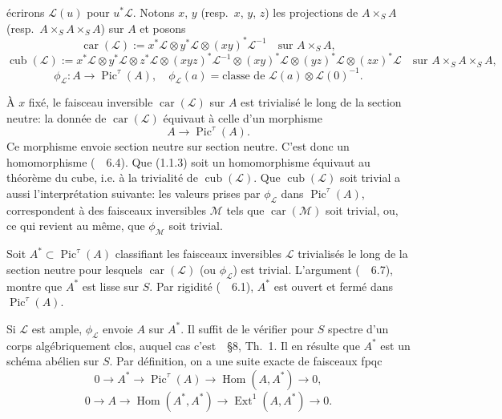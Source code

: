 \documentclass[11pt,a4paper]{article}
\theoremstyle{plain}
\theoremstyle{definition}
\DeclareMathOperator{\Ext}{Ext}
\DeclareMathOperator{\Hom}{Hom}
\DeclareMathOperator{\car}{car}
\DeclareMathOperator{\cub}{cub}
\DeclareMathOperator{\Pic}{Pic}
\begin{document}
\'ecrirons $\mathscr{L}(u)$ pour $u^*\mathscr{L}$. Notons $x$, $y$ (resp.~$x$, $y$, $z$) les projections de $A \times_S A$
(resp.~$A \times_S A \times_S A$) sur $A$ et posons
\begin{equation}
\car(\mathscr{L}) := x^*\mathscr{L} \otimes y^*\mathscr{L} \otimes (xy)^*\mathscr{L}^{-1} \quad \text{sur } A \times_S A,
\end{equation}
\begin{equation}
\cub(\mathscr{L}) := x^*\mathscr{L} \otimes y^*\mathscr{L} \otimes z^*\mathscr{L} \otimes (xyz)^*\mathscr{L}^{-1}
\otimes (xy)^*\mathscr{L} \otimes (yz)^*\mathscr{L} \otimes (zx)^*\mathscr{L} \quad \text{sur } A \times_S A \times_S A,
\end{equation}
\begin{equation}
\phi_{\mathscr{L}} : A \longrightarrow \Pic^\tau(A), \quad \phi_{\mathscr{L}}(a) = \text{classe de } \mathscr{L}(a) \otimes \mathscr{L}(0)^{-1}.
\end{equation}

\`A $x$ fix\'e, le faisceau inversible $\car(\mathscr{L})$ sur $A$ est trivialis\'e le long de la section
neutre: la donn\'ee de $\car(\mathscr{L})$ \'equivaut \`a celle d'un morphisme
\begin{equation}
A \longrightarrow \Pic^\tau(A).
\end{equation}
Ce morphisme envoie section neutre sur section neutre. C'est donc un
homomorphisme (~\cite{GIT}~6.4). Que (1.1.3) soit un homomorphisme \'equivaut au
th\'eor\`eme du cube, i.e. \`a la trivialit\'e de $\cub(\mathscr{L})$. Que $\cub(\mathscr{L})$ soit trivial a aussi
l'interpr\'etation suivante: les valeurs prises par $\phi_{\mathscr{L}}$ dans $\Pic^\tau(A)$, correspondent
\`a des faisceaux inversibles $\mathscr{M}$ tels que $\car(\mathscr{M})$ soit trivial, ou, ce qui revient au
m\^eme, que $\phi_{\mathscr{M}}$ soit trivial.

Soit $A^* \subset \Pic^\tau(A)$ classifiant les faisceaux inversibles $\mathscr{L}$ trivialis\'es le long de
la section neutre pour lesquels $\car(\mathscr{L})$ (ou $\phi_{\mathscr{L}}$) est trivial. L'argument (~\cite{GIT}~6.7),
montre que $A^*$ est lisse sur $S$. Par rigidit\'e (~\cite{GIT}~6.1), $A^*$ est ouvert et ferm\'e dans
$\Pic^\tau(A)$.

Si $\mathscr{L}$ est ample, $\phi_{\mathscr{L}}$ envoie $A$ sur $A^*$. Il suffit de le v\'erifier pour $S$ spectre
d'un corps alg\'ebriquement clos, auquel cas c'est~\cite{AV}~\S8, Th.~1. Il en r\'esulte que
$A^*$ est un sch\'ema ab\'elien sur $S$. Par d\'efinition, on a une suite exacte de
faisceaux fpqc
\begin{equation}
0 \longrightarrow A^* \longrightarrow \Pic^\tau(A) \xrightarrow{\quad} \Hom(A, A^*) \longrightarrow 0,
\end{equation}
\begin{equation}
0 \longrightarrow A \xrightarrow{\quad} \Hom(A^*, A^*) \longrightarrow \Ext^1(A, A^*) \longrightarrow 0.
\end{equation}
\end{document}
